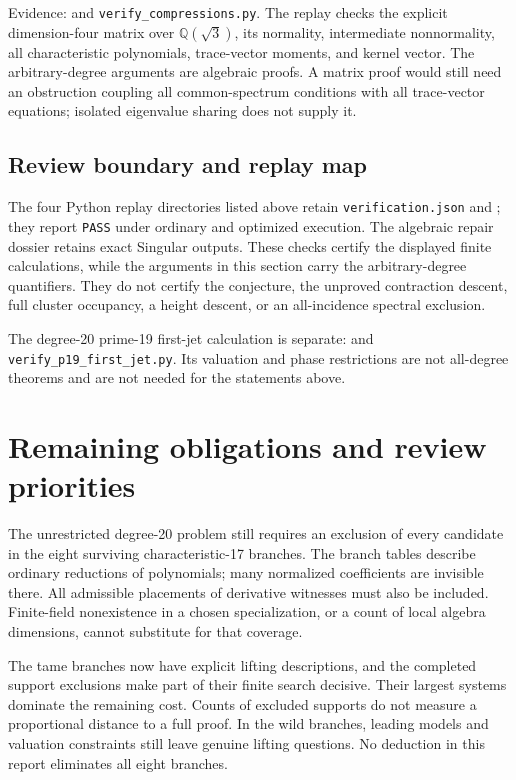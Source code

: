 \documentclass[
  british,
  10pt,
]{article}
\newcounter{none} %
\begin{document}
Evidence:  and
\texttt{verify\_compressions.py}. The replay checks the explicit
dimension-four matrix over \(\mathbb Q(\sqrt3)\), its normality,
intermediate nonnormality, all characteristic polynomials, trace-vector
moments, and kernel vector. The arbitrary-degree arguments are algebraic
proofs. A matrix proof would still need an obstruction coupling all
common-spectrum conditions with all trace-vector equations; isolated
eigenvalue sharing does not supply it.

\subsection{Review boundary and replay
map}\label{review-boundary-and-replay-map}

The four Python replay directories listed above retain
\texttt{verification.json} and ; they
report \texttt{PASS} under ordinary and optimized execution. The
algebraic repair dossier retains exact Singular outputs. These checks
certify the displayed finite calculations, while the arguments in this
section carry the arbitrary-degree quantifiers. They do not certify the
conjecture, the unproved contraction descent, full cluster occupancy, a
height descent, or an all-incidence spectral exclusion.

The degree-20 prime-19 first-jet calculation is separate:
 and
\texttt{verify\_p19\_first\_jet.py}. Its valuation and phase
restrictions are not all-degree theorems and are not needed for the
statements above.

\section{Remaining obligations and review
priorities}\label{remaining-obligations-and-review-priorities}

The unrestricted degree-20 problem still requires an exclusion of every
candidate in the eight surviving characteristic-17 branches. The branch
tables describe ordinary reductions of polynomials; many normalized
coefficients are invisible there. All admissible placements of
derivative witnesses must also be included. Finite-field nonexistence in
a chosen specialization, or a count of local algebra dimensions, cannot
substitute for that coverage.

The tame branches now have explicit lifting descriptions, and the
completed support exclusions make part of their finite search decisive.
Their largest systems dominate the remaining cost. Counts of excluded
supports do not measure a proportional distance to a full proof. In the
wild branches, leading models and valuation constraints still leave
genuine lifting questions. No deduction in this report eliminates all
eight branches.
\end{document}
